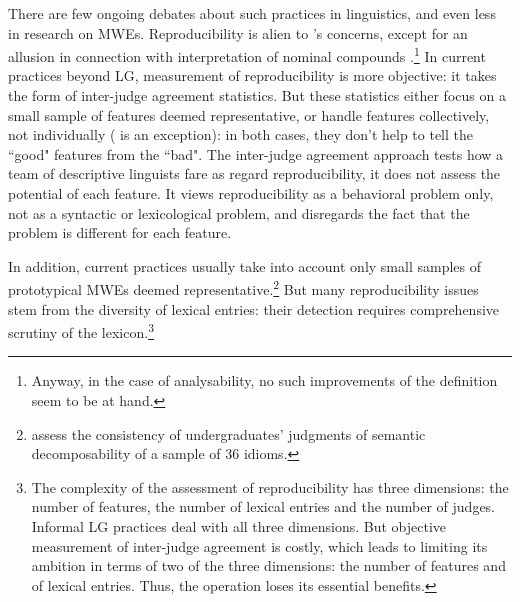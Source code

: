\documentclass[output=paper]{langsci/langscibook}
\begin{document}
There are few ongoing debates about such practices in linguistics, and even less in research on MWEs. Reproducibility is alien to \cite{Baldwin2010}'s concerns, except for an allusion in connection with interpretation of nominal compounds \citep[275]{Baldwin2010}.\footnote{Anyway, in the case of  analysability, no such improvements of the definition seem to be at hand.} In current practices beyond LG, measurement of reproducibility is more objective: it takes the form of inter-judge agreement statistics. But these statistics either focus on a small sample of features deemed representative, or handle features collectively, not individually (\citealt[86]{Palmer} is an exception): in both cases, they don’t help to tell the ``good"  features from the ``bad". The inter-judge agreement approach tests how a team of descriptive linguists fare as regard reproducibility, it does not assess the potential of each feature. It views reproducibility as a behavioral problem only, not as a syntactic or lexicological problem, and disregards the fact that the problem is different for each feature.

 
In addition, current practices usually take into account only small samples of prototypical MWEs deemed representative.\footnote{\cite[60]{Gibbs1989a}  assess the consistency of undergraduates’ judgments of semantic decomposability of a sample of 36 idioms.} But many reproducibility issues stem from the diversity of lexical entries: 
their detection requires comprehensive scrutiny of the lexicon.\footnote{The complexity of the assessment of reproducibility has three dimensions: the number of features, the number of lexical entries and the number of judges. Informal LG practices deal with all three dimensions. But objective measurement of inter-judge agreement is costly, which leads to limiting its ambition in terms of two of the three dimensions: the number of features and of lexical entries. Thus, the operation loses its essential benefits.}
\end{document}
